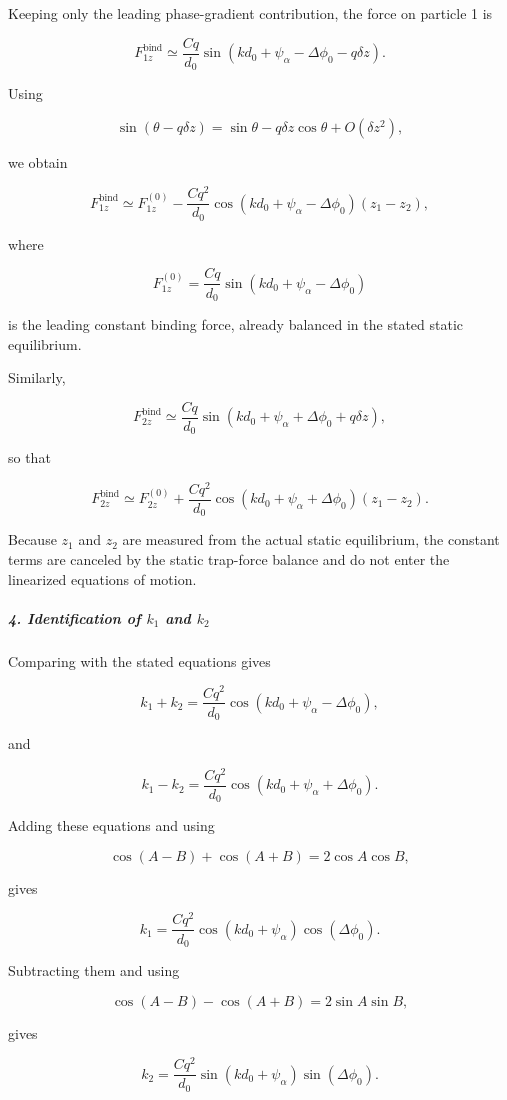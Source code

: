 Keeping only the leading phase-gradient contribution, the force on particle
1 is

\[
F_{1z}^{\mathrm{bind}} \simeq \frac{Cq}{d_0}
\sin\!\left(kd_0+\psi_\alpha-\Delta\phi_0-q\delta z\right).
\]

Using

\[
\sin(\theta-q\delta z) = \sin\theta-q\delta z\cos\theta+O(\delta z^2),
\]

we obtain

\[
F_{1z}^{\mathrm{bind}} \simeq F_{1z}^{(0)}
- \frac{Cq^2}{d_0}
\cos(kd_0+\psi_\alpha-\Delta\phi_0)(z_1-z_2),
\]

where

\[
F_{1z}^{(0)} = \frac{Cq}{d_0}
\sin(kd_0+\psi_\alpha-\Delta\phi_0)
\]

is the leading constant binding force, already balanced in the stated static
equilibrium.

Similarly,

\[
F_{2z}^{\mathrm{bind}} \simeq \frac{Cq}{d_0}
\sin\!\left(kd_0+\psi_\alpha+\Delta\phi_0+q\delta z\right),
\]

so that

\[
F_{2z}^{\mathrm{bind}} \simeq F_{2z}^{(0)}
+ \frac{Cq^2}{d_0}
\cos(kd_0+\psi_\alpha+\Delta\phi_0)(z_1-z_2).
\]

Because $z_1$ and $z_2$ are measured from the actual static equilibrium, the
constant terms are canceled by the static trap-force balance and do not enter
the linearized equations of motion.

\subparagraph*{4. Identification of $k_1$ and $k_2$}

Comparing with the stated equations gives

\[
k_1+k_2 = \frac{Cq^2}{d_0}
\cos(kd_0+\psi_\alpha-\Delta\phi_0),
\]

and

\[
k_1-k_2 = \frac{Cq^2}{d_0}
\cos(kd_0+\psi_\alpha+\Delta\phi_0).
\]

Adding these equations and using

\[
\cos(A-B)+\cos(A+B)=2\cos A\cos B,
\]

gives

\[
k_1 = \frac{Cq^2}{d_0}
\cos(kd_0+\psi_\alpha)\cos(\Delta\phi_0).
\]

Subtracting them and using

\[
\cos(A-B)-\cos(A+B)=2\sin A\sin B,
\]

gives

\[
k_2 = \frac{Cq^2}{d_0}
\sin(kd_0+\psi_\alpha)\sin(\Delta\phi_0).
\]


